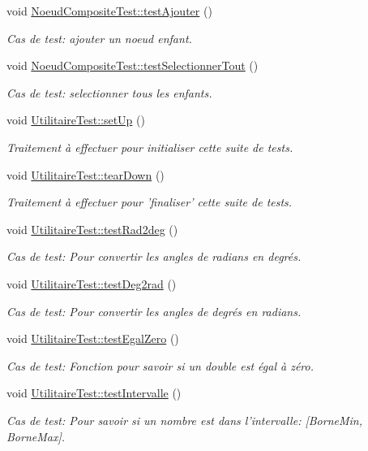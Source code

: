 \begin{DoxyCompactItemize}
void \hyperlink{group__inf2990_gaaeb7bf3f97cb196df2398cdf1a639469}{Noeud\-Composite\-Test\-::test\-Ajouter} ()
\begin{DoxyCompactList}\small\item\em Cas de test\-: ajouter un noeud enfant. \end{DoxyCompactList}\item 
\hypertarget{group__inf2990_ga585be1924a9bfe61c2ee7bf91491695a}{void \hyperlink{group__inf2990_ga585be1924a9bfe61c2ee7bf91491695a}{Noeud\-Composite\-Test\-::test\-Selectionner\-Tout} ()}\label{group__inf2990_ga585be1924a9bfe61c2ee7bf91491695a}

\begin{DoxyCompactList}\small\item\em Cas de test\-: selectionner tous les enfants. \end{DoxyCompactList}\item 
void \hyperlink{group__inf2990_ga3a6ce920fe07fe029450c3221592f43e}{Utilitaire\-Test\-::set\-Up} ()
\begin{DoxyCompactList}\small\item\em Traitement à effectuer pour initialiser cette suite de tests. \end{DoxyCompactList}\item 
void \hyperlink{group__inf2990_gac4dc695e75bf75295e629e73cb55abf0}{Utilitaire\-Test\-::tear\-Down} ()
\begin{DoxyCompactList}\small\item\em Traitement à effectuer pour 'finaliser' cette suite de tests. \end{DoxyCompactList}\item 
void \hyperlink{group__inf2990_ga99986aa1af0f2f7eba4f0854bd44496b}{Utilitaire\-Test\-::test\-Rad2deg} ()
\begin{DoxyCompactList}\small\item\em Cas de test\-: Pour convertir les angles de radians en degrés. \end{DoxyCompactList}\item 
void \hyperlink{group__inf2990_gac029f9bee013cf1991a4b5922515c00b}{Utilitaire\-Test\-::test\-Deg2rad} ()
\begin{DoxyCompactList}\small\item\em Cas de test\-: Pour convertir les angles de degrés en radians. \end{DoxyCompactList}\item 
void \hyperlink{group__inf2990_ga82ce5c8ba751ce2773389fc98448718c}{Utilitaire\-Test\-::test\-Egal\-Zero} ()
\begin{DoxyCompactList}\small\item\em Cas de test\-: Fonction pour savoir si un double est égal à zéro. \end{DoxyCompactList}\item 
void \hyperlink{group__inf2990_ga5c34fe0b98799c5820e2c4f54e689d98}{Utilitaire\-Test\-::test\-Intervalle} ()
\begin{DoxyCompactList}\small\item\em Cas de test\-: Pour savoir si un nombre est dans l'intervalle\-: \mbox{[}Borne\-Min, Borne\-Max\mbox{]}. \end{DoxyCompactList}\end{DoxyCompactItemize}
